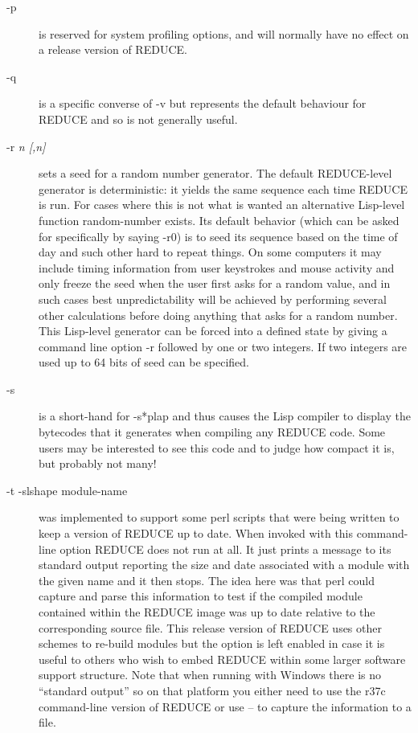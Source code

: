 \documentclass[a4paper,11pt]{article}
\begin{document}
\begin{description}
\item[{\ttfamily -p}] is reserved for system profiling options, and will
normally have no effect on a release version of REDUCE.

\item[{\ttfamily -q}] is a specific converse of {\ttfamily -v} but
represents the default behaviour for REDUCE and so is not generally
useful.

\item[{\ttfamily -r \rmfamily \slshape n [,n]}] sets a seed for a random
number generator. The default REDUCE-level generator is deterministic:
it yields the same sequence each time REDUCE is run. For cases where this
is not what is wanted an alternative Lisp-level function
{\ttfamily random-number} exists. Its default behavior (which can be
asked for specifically by saying {\ttfamily -r0}) is to seed its
sequence based on the time of day and such other hard to repeat things.
On some computers it may include timing information from user keystrokes
and mouse activity and only freeze the seed when the user first asks for
a random value, and in such cases best unpredictability will be achieved
by performing several other calculations before doing anything that
asks for a random number.  This Lisp-level generator can be forced
into a defined state by giving a command line option {\ttfamily -r}
followed by one or two integers. If two integers are used up to 64
bits of seed can be specified.

\item[{\ttfamily -s}] is a short-hand for {\ttfamily -s*plap} and thus
causes the Lisp compiler to display the bytecodes that it generates
when compiling any REDUCE code. Some users may be interested to see
this code and to judge how compact it is, but probably not many!

\item[{\ttfamily -t \rmfamily -slshape module-name}] was implemented to support
some {\ttfamily perl} scripts that were being written to keep a version
of REDUCE up to date. When invoked with this command-line option REDUCE does
not run at all. It just prints a message to its standard output reporting
the size and date associated with a module with the given name and it then
stops. The idea here was that {\ttfamily perl} could capture and parse
this information to test if the compiled module contained within the
REDUCE image was up to date relative to the corresponding source file.
This release version of REDUCE uses other schemes to re-build modules
but the option is left enabled in case it is useful to others who wish to
embed REDUCE within some larger software support structure. Note that
when running with Windows there is no ``standard output'' so on that
platform you either need to use the {\ttfamily r37c} command-line version
of REDUCE or use {\ttfamily --} to capture the information to a file.


\end{description}
\end{document}
